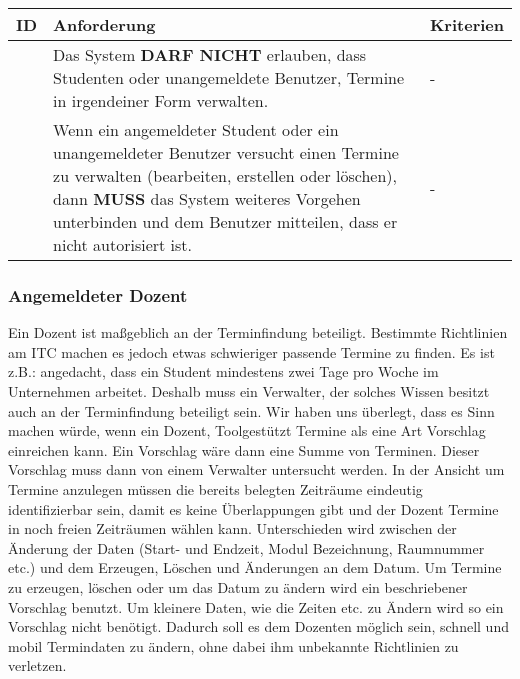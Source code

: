 \vspace{12pt}

\begin{tabular} {|p{}|p{}|p{}|}
	\hline
	ID & Anforderung & Kriterien \\
	\hline
	\printfreqnr
	& Das System \textbf{DARF NICHT} erlauben, dass Studenten oder unangemeldete Benutzer, Termine in irgendeiner Form verwalten. 
	& - \\
	\hline
	\printfreqnr
	& Wenn ein angemeldeter Student oder ein unangemeldeter Benutzer versucht einen Termine zu verwalten (bearbeiten, erstellen oder löschen), dann \textbf{MUSS} das System weiteres Vorgehen unterbinden und dem Benutzer mitteilen, dass er nicht autorisiert ist.
	& - \\ 
	\hline
\end{tabular}

\newpage

\subsubsection{Angemeldeter Dozent}
Ein Dozent ist maßgeblich an der Terminfindung beteiligt. Bestimmte Richtlinien am ITC machen es jedoch etwas schwieriger passende Termine zu finden. Es ist z.B.: angedacht, dass ein Student mindestens zwei Tage pro Woche im Unternehmen arbeitet. Deshalb muss ein Verwalter, der solches Wissen besitzt auch an der Terminfindung beteiligt sein. Wir haben uns überlegt, dass es Sinn machen würde, wenn ein Dozent, Toolgestützt Termine als eine Art Vorschlag einreichen kann. Ein Vorschlag wäre dann eine Summe von Terminen. Dieser Vorschlag muss dann von einem Verwalter untersucht werden. In der Ansicht um Termine anzulegen müssen die bereits belegten Zeiträume eindeutig identifizierbar sein, damit es keine Überlappungen gibt und der Dozent Termine in noch freien Zeiträumen wählen kann. Unterschieden wird zwischen der Änderung der Daten (Start- und Endzeit, Modul Bezeichnung, Raumnummer etc.) und dem Erzeugen, Löschen und Änderungen an dem Datum. Um Termine zu erzeugen, löschen oder um das Datum zu ändern wird ein beschriebener Vorschlag benutzt. Um kleinere Daten, wie die Zeiten etc. zu Ändern wird so ein Vorschlag nicht benötigt. Dadurch soll es dem Dozenten möglich sein, schnell und mobil Termindaten zu ändern, ohne dabei ihm unbekannte Richtlinien zu verletzen.

\vspace{12pt}

